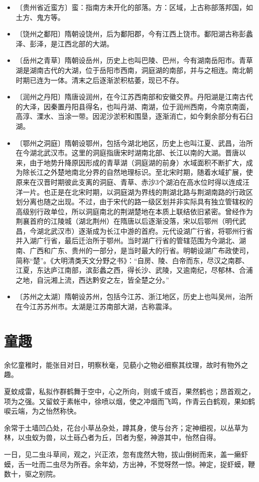 \documentclass[12pt,UTF-8,openany,a4]{ctexbook}
\begin{document}
\begin{itemize}
    \item〔贵州省近蛮方〕{\yiwen 蛮：指南方未开化的部落。方：区域，上古称部落邦国，如土方、鬼方等。}
    \item〔饶州之鄱阳〕{\yiwen 隋朝设饶州，后为鄱阳郡，今有江西上饶市。鄱阳湖古称彭蠡泽、彭泽，是江西北部的大湖。}
    \item〔岳州之青草〕{\yiwen 隋朝设岳州，历史上也叫巴陵、巴州，今有湖南岳阳市。青草湖是湖南古代的大湖，位于岳阳市西南，洞庭湖的南部，并与之相连。南北朝时期已连为一体。清末之后逐渐淤积枯萎，现已不存。}
    \item〔润州之丹阳〕{\yiwen 隋唐设润州，在今江苏西南部和安徽交界。丹阳湖是江南古代的大泽，因秦置丹阳县得名，也叫丹湖、南湖，位于润州西南，今南京南面，高淳、溧水、当涂一带。因泥沙淤积和围垦，逐渐消亡，如今剩余部分有石臼湖。}
    \item〔鄂州之洞庭〕{\yiwen 隋朝设鄂州，包括今湖北地区，历史上也叫江夏、武昌，治所在今湖北武汉市。这里的洞庭指唐宋时湖南北部、长江以南的大湖。晋唐以来，由于地势升降原因形成的青草湖（洞庭湖的前身）水域面积不断扩大，成为除长江之外楚地南北分界的自然地理标识。至北宋时期，随着水域扩展，使原来在汉晋时期彼此支离的洞庭、青草、赤沙3个湖泊在高水位时得以连成汪洋一片。也正是在北宋时期，以洞庭湖为界线的荆湖北路与荆湖南路的行政区划分离也随之出现。不过，由于宋代的路一级区划并非实际具有独立管辖权的高级别行政单位，所以洞庭南北的荆湖楚地在本质上联结依旧紧密。曾经作为荆襄首府的江陵城（湖北荆州）在隋唐以后逐渐没落，宋以后鄂州（明代武昌，今湖北武汉市）逐渐成为长江中游的首府。元代设湖广行省，将鄂州行省并入湖广行省，最后迁治所于鄂州。当时湖广行省的管辖范围为今湖北、湖南、广西和广东、贵州的一部分，是当时最大的行省。明朝设湖广布政使司，简称“楚”。《大明清类天文分野之书》：“自房、陵、白帝而东，尽汉之南郡、江夏，东达庐江南部，滨彭蠡之西，得长沙、武陵，又逾南纪，尽郁林、合浦之地，自沅湘上流，西达黔安之左，皆全楚之分。”}
    \item〔苏州之太湖〕{\yiwen 隋朝设苏州，包括今江苏、浙江地区，历史上也叫吴州，治所在今江苏苏州市。太湖是江苏南部大湖，古称震泽。}
\end{itemize}

\chapter{童趣}

\begin{large}
    
    余忆童稚时，能张目对日，明察秋毫，见藐小之物必细察其纹理，故时有物外之趣。
    
    夏蚊成雷，私拟作群鹤舞于空中，心之所向，则或千或百，果然鹤也；昂首观之，项为之强。又留蚊于素帐中，徐喷以烟，使之冲烟而飞鸣，作青云白鹤观，果如鹤唳云端，为之怡然称快。
    
    余常于土墙凹凸处，花台小草丛杂处，蹲其身，使与台齐；定神细视，以丛草为林，以虫蚁为兽，以土砾凸者为丘，凹者为壑，神游其中，怡然自得。
    
    一日，见二虫斗草间，观之，兴正浓，忽有庞然大物，拔山倒树而来，盖一癞虾蟆，舌一吐而二虫尽为所吞。余年幼，方出神，不觉呀然一惊。神定，捉虾蟆，鞭数十，驱之别院。

\end{large}
\end{document}
